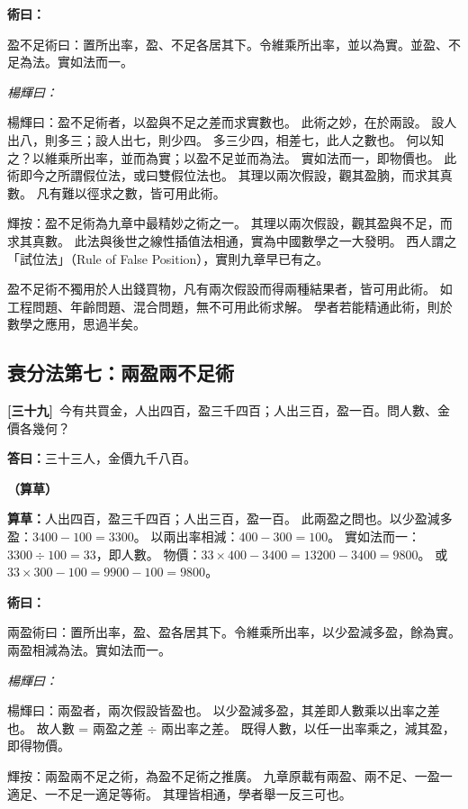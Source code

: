 \documentclass[11pt,a4paper]{article}
\newenvironment{method}{%
  \par\noindent\textcolor{methodcolor}{\textbf{術曰：}}%
  \ignorespaces
}{\par\vspace{0.5em}}
\newenvironment{caocao}{%
  \par\noindent\textcolor{caocaocolor}{\small\textbf{（算草）}}%
  \ignorespaces
}{\par\vspace{0.5em}}
\newenvironment{yanghuicomment}{%
  \par\noindent\textcolor{commentarycolor}{\small\textit{楊輝曰：}}%
  \ignorespaces
}{\par\vspace{0.5em}}
\newcommand{\problemnum}[1]{\textbf{[\ignorespaces#1\unskip]}}
\begin{document}
\begin{method}
盈不足術曰：置所出率，盈、不足各居其下。令維乘所出率，並以為實。並盈、不足為法。實如法而一。
\end{method}

\begin{yanghuicomment}
楊輝曰：盈不足術者，以盈與不足之差而求實數也。
此術之妙，在於兩設。
設人出八，則多三；設人出七，則少四。
多三少四，相差七，此人之數也。
何以知之？以維乘所出率，並而為實；以盈不足並而為法。
實如法而一，即物價也。
此術即今之所謂假位法，或曰雙假位法也。
其理以兩次假設，觀其盈朒，而求其真數。
凡有難以徑求之數，皆可用此術。

輝按：盈不足術為九章中最精妙之術之一。
其理以兩次假設，觀其盈與不足，而求其真數。
此法與後世之線性插值法相通，實為中國數學之一大發明。
西人謂之「試位法」（Rule of False Position），實則九章早已有之。

盈不足術不獨用於人出錢買物，凡有兩次假設而得兩種結果者，皆可用此術。
如工程問題、年齡問題、混合問題，無不可用此術求解。
學者若能精通此術，則於數學之應用，思過半矣。
\end{yanghuicomment}

\subsection{衰分法第七：兩盈兩不足術}

\noindent\problemnum{三十九}\,
今有共買金，人出四百，盈三千四百；人出三百，盈一百。問人數、金價各幾何？

\noindent\textcolor{answercolor}{\textbf{答曰：}}三十三人，金價九千八百。

\begin{caocao}
\textbf{算草：}人出四百，盈三千四百；人出三百，盈一百。
此兩盈之問也。以少盈減多盈：$3400 - 100 = 3300$。
以兩出率相減：$400 - 300 = 100$。
實如法而一：$3300 \div 100 = 33$，即人數。
物價：$33 \times 400 - 3400 = 13200 - 3400 = 9800$。
或$33 \times 300 - 100 = 9900 - 100 = 9800$。
\end{caocao}

\begin{method}
兩盈術曰：置所出率，盈、盈各居其下。令維乘所出率，以少盈減多盈，餘為實。兩盈相減為法。實如法而一。
\end{method}

\begin{yanghuicomment}
楊輝曰：兩盈者，兩次假設皆盈也。
以少盈減多盈，其差即人數乘以出率之差也。
故人數 = 兩盈之差 $\div$ 兩出率之差。
既得人數，以任一出率乘之，減其盈，即得物價。

輝按：兩盈兩不足之術，為盈不足術之推廣。
九章原載有兩盈、兩不足、一盈一適足、一不足一適足等術。
其理皆相通，學者舉一反三可也。
\end{yanghuicomment}
\end{document}

